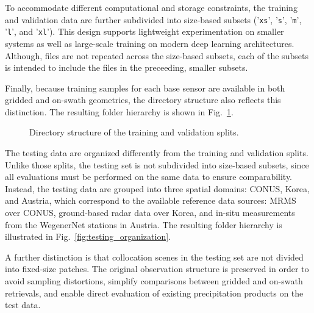 \documentclass[11pt]{article}
\begin{document}
To accommodate different computational and storage constraints, the training and
validation data are further subdivided into size-based subsets ('\texttt{xs}',
'\texttt{s}', '\texttt{m}', '\texttt{l}', and '\texttt{xl}'). This design
supports lightweight experimentation on smaller systems as well as large-scale
training on modern deep learning architectures. Although, files are not repeated across the size-based subsets, each of the subsets is intended to include the files in the preceeding, smaller subsets.

Finally, because training samples for each base sensor are available in both
gridded and on-swath geometries, the directory structure also reflects this
distinction. The resulting folder hierarchy is shown in
Fig.~\ref{fig:train_val_organization}.

\begin{figure}[htbp] %


	\caption{
    Directory structure of the training and validation splits.
	}
	\label{fig:train_val_organization}
\end{figure}

The testing data are organized differently from the training and validation splits. Unlike those splits, the testing set is not subdivided into size-based subsets, since all evaluations must be performed on the same data to ensure comparability. Instead, the testing data are grouped into three spatial domains: CONUS, Korea, and Austria, which correspond to the available reference data sources: MRMS over CONUS, ground-based radar data over Korea, and in-situ measurements from the WegenerNet stations in Austria. The resulting folder hierarchy is illustrated in Fig.~\ref{fig:testing_organization}.

A further distinction is that collocation scenes in the testing set are not
divided into fixed-size patches. The original observation structure is preserved
in order to avoid sampling distortions, simplify comparisons between gridded and
on-swath retrievals, and enable direct evaluation of existing precipitation
products on the test data.
\end{document}
